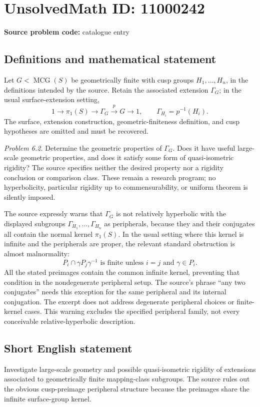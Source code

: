 \documentclass[11pt]{article}
\begin{document}
\section*{UnsolvedMath ID: 11000242}
\textbf{Source problem code:} catalogue entry
\subsection{Definitions and mathematical statement}
Let \(G<\operatorname{MCG}(S)\) be geometrically finite with cusp groups \(H_1,\ldots,H_n\), in the definitions intended by the source. Retain the associated extension \(\Gamma_G\); in the usual surface-extension setting,
\[
 1\longrightarrow\pi_1(S)\longrightarrow\Gamma_G
 \overset{p}{\longrightarrow}G\longrightarrow1,
 \qquad\Gamma_{H_i}=p^{-1}(H_i).
\]
The surface, extension construction, geometric-finiteness definition, and cusp hypotheses are omitted and must be recovered.

\emph{Problem 6.2.} Determine the geometric properties of \(\Gamma_G\). Does it have useful large-scale geometric properties, and does it satisfy some form of quasi-isometric rigidity? The source specifies neither the desired property nor a rigidity conclusion or comparison class. These remain a research program; no hyperbolicity, particular rigidity up to commensurability, or uniform theorem is silently imposed.

The source expressly warns that \(\Gamma_G\) is not relatively hyperbolic with the displayed subgroups \(\Gamma_{H_1},\ldots,\Gamma_{H_n}\) as peripherals, because they and their conjugates all contain the normal kernel \(\pi_1(S)\). In the usual setting where this kernel is infinite and the peripherals are proper, the relevant standard obstruction is almost malnormality:
\[
 P_i\cap\gamma P_j\gamma^{-1}\text{ is finite unless }
 i=j\text{ and }\gamma\in P_i.
\]
All the stated preimages contain the common infinite kernel, preventing that condition in the nondegenerate peripheral setup. The source's phrase ``any two conjugates'' needs this exception for the same peripheral and its internal conjugation. The excerpt does not address degenerate peripheral choices or finite-kernel cases. This warning excludes the specified peripheral family, not every conceivable relative-hyperbolic description.
\subsection{Short English statement}
Investigate large-scale geometry and possible quasi-isometric rigidity of extensions associated to geometrically finite mapping-class subgroups. The source rules out the obvious cusp-preimage peripheral structure because the preimages share the infinite surface-group kernel.
\end{document}
